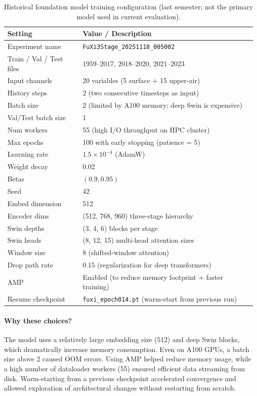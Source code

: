 \documentclass[12pt]{report}
\begin{document}
\begin{table}[H]
\centering
\caption{Historical foundation model training configuration (last semester; not the primary model used in current evaluation).}
\begin{tabular}{ll}
\hline
\textbf{Setting} & \textbf{Value / Description} \\
\hline
Experiment name & \texttt{FuXi3Stage\_20251118\_005002} \\
Train / Val / Test files & 1959--2017, 2018--2020, 2021--2023 \\
Input channels & 20 variables (5 surface + 15 upper-air) \\
History steps & 2 (two consecutive timesteps as input) \\
Batch size & 2 (limited by A100 memory; deep Swin is expensive) \\
Val/Test batch size & 1 \\
Num workers & 55 (high I/O throughput on HPC cluster) \\
Max epochs & 100 with early stopping (patience = 5) \\
Learning rate & $1.5\times10^{-4}$ (AdamW) \\
Weight decay & 0.02 \\
Betas & $(0.9, 0.95)$ \\
Seed & 42 \\
Embed dimension & 512 \\
Encoder dims & (512, 768, 960) three-stage hierarchy \\
Swin depths & (3, 4, 6) blocks per stage \\
Swin heads & (8, 12, 15) multi-head attention sizes \\
Window size & 8 (shifted-window attention) \\
Drop path rate & 0.15 (regularization for deep transformers) \\
AMP & Enabled (to reduce memory footprint + faster training) \\
Resume checkpoint &
\texttt{fuxi\_epoch014.pt} (warm-start from previous run) \\
\hline
\end{tabular}
\end{table}

\paragraph{Why these choices?}
The model uses a relatively large embedding size (512) and deep Swin blocks, which dramatically increase memory consumption. Even on A100 GPUs, a batch size above 2 caused OOM errors. Using AMP helped reduce memory usage, while a high number of dataloader workers (55) ensured efficient data streaming from disk. Warm-starting from a previous checkpoint accelerated convergence and allowed exploration of architectural changes without restarting from scratch.
\end{document}
